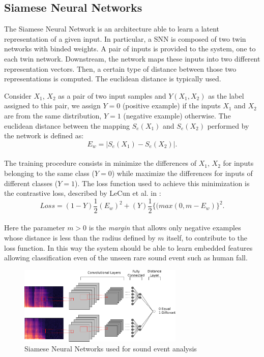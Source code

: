 \subsection{Siamese Neural Networks}

The Siamese Neural Network is an architecture able to learn a latent representation of a given input. In particular, a SNN is composed of two twin networks with binded weights. A pair of inputs is provided to the system, one to each twin network. Downstream, the network maps these inputs into two different representation vectors. Then, a certain type of distance between those two representations is computed. The euclidean distance is typically used. 

Consider $X_1$, $X_2$ as a pair of two input samples and $Y(X_1, X_2)$ as the label assigned to this pair, we assign $Y = 0$ (positive example) if the inputs $X_1$ and $X_2$ are from the same distribution, $Y = 1$ (negative example) otherwise. The euclidean distance between the mapping $S_e(X_1)$ and $S_e(X_2)$ performed by the network is defined as:
\begin{equation}
E_w = \left|{S_e (X_1) - S_e (X_2)}\right|.
\end{equation}\\
The training procedure consists in minimize the differences of $X_1$, $X_2$ for inputs belonging to the same class ($Y = 0$) while maximize the differences for inputs of different classes ($Y = 1$).
The loss function used to achieve this minimization is the contrastive loss, described by LeCun et al. in \cite{chopra2005learning}:
\begin{equation}
Loss = (1 - Y)\frac{1}{2}(E_w)^2 + (Y)\frac{1}{2}\{(max(0, m - E_w)\}^2 .
\end{equation}\\
Here the parameter $m > 0$ is the \textit{margin} that allows only negative examples whose distance is less than the radius defined by $m$ itself, to contribute to the loss function.
In this way the system should be able to learn embedded features allowing classification even of the unseen rare sound event such as human fall.

\begin{figure}[h]
	\centering
	\includegraphics[width=0.7\textwidth]{img/Siamese_approach}
	\caption[Siamese DNN]{Siamese Neural Networks used for sound event analysis}
	\label{fig:siamese}
\end{figure}


